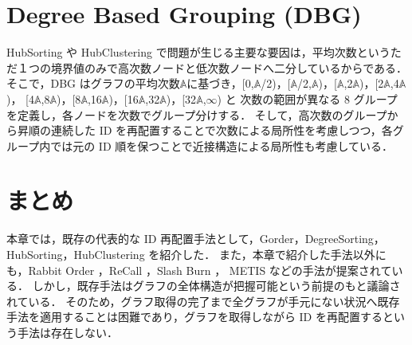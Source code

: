 \section{Degree Based Grouping (DBG)}
HubSorting や HubClustering で問題が生じる主要な要因は，平均次数というただ１つの境界値のみで高次数ノードと低次数ノードへ二分しているからである．
そこで，DBG \cite{faldu2019closer}はグラフの平均次数$\mathbb{A}$に基づき，[0,$\mathbb{A}$/2)，[$\mathbb{A}$/2,$\mathbb{A}$)，[$\mathbb{A}$,2$\mathbb{A}$)，[2$\mathbb{A}$,4$\mathbb{A}$)，
[4$\mathbb{A}$,8$\mathbb{A}$)，[8$\mathbb{A}$,16$\mathbb{A}$)，[16$\mathbb{A}$,32$\mathbb{A}$)，[32$\mathbb{A}$,$\infty$)
と 次数の範囲が異なる 8 グループを定義し，各ノードを次数でグループ分けする．
そして，高次数のグループから昇順の連続した ID を再配置することで次数による局所性を考慮しつつ，各グループ内では元の ID 順を保つことで近接構造による局所性も考慮している．
\section{まとめ}
本章では，既存の代表的な ID 再配置手法として，Gorder，DegreeSorting，HubSorting，HubClustering を紹介した．
また，本章で紹介した手法以外にも，Rabbit Order \cite{arai2016rabbit}，ReCall \cite{lakhotia2017recall}，Slash Burn \cite{kang2011beyond}，
METIS \cite{karypis1998multilevelk} などの手法が提案されている．
しかし，既存手法はグラフの全体構造が把握可能という前提のもと議論されている．
そのため，グラフ取得の完了まで全グラフが手元にない状況へ既存手法を適用することは困難であり，グラフを取得しながら ID を再配置するという手法は存在しない．